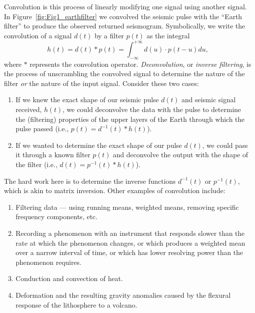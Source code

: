 
Convolution is this process of linearly modifying one signal using another signal.  In Figure~\ref{fig:Fig1_earthfilter} we 
convolved the seismic pulse with the ``Earth filter'' to produce the observed returned seismogram.  
Symbolically, we write the convolution of a signal $d(t)$ by a filter $p(t)$ as the integral
\begin{equation}
h(t) = d(t) * p(t) = \int_{-\infty}^{+\infty} d(u) \cdot p(t-u) du,
\label{eq:convolution}
\end{equation}
where $*$ represents the convolution operator.
\emph{Deconvolution}, or \emph{inverse filtering}, is the process of unscrambling the convolved signal to 
determine the nature of the filter \emph{or} the nature of the input signal.  Consider these two cases:
\begin{enumerate}
\item If we knew the exact shape of our seismic pulse $d(t)$ and seismic signal received, $h(t)$, we could 
deconvolve the data with the pulse to determine the (filtering) properties of the upper layers of the Earth through 
which the pulse passed (i.e., $p(t) = d^{-1}(t) * h(t)$).
\item If we wanted to determine the exact shape of our pulse $d(t)$, we could pass it through a known 
filter $p(t)$ and deconvolve the output with the shape of the filter (i.e., $d(t) = p^{-1}(t) * h(t)$).
\end{enumerate}
The hard work here is to determine the inverse functions $d^{-1}(t)$ or $p^{-1}(t)$, which is akin to matrix inversion.
Other examples of convolution include:
\begin{enumerate}
\item Filtering data --- using running means, weighted means, removing specific frequency components, 
etc.
 \item Recording a phenomenon with an instrument that responds slower than the rate at which the 
phenomenon changes, or which produces a weighted mean over a narrow interval of time,
or which has lower resolving power than the phenomenon requires.
\item Conduction and convection of heat.
\item Deformation and the resulting gravity anomalies caused by the flexural response of the lithosphere
to a volcano.
\end{enumerate}

